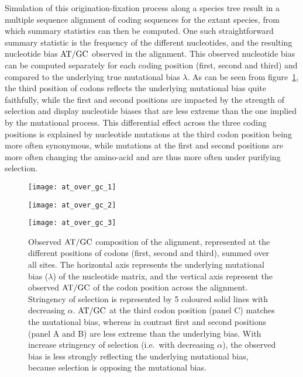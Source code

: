 Simulation of this origination-fixation process along a species tree result in a multiple sequence alignment of coding sequences for the extant species, from which summary statistics can then be computed.
One such straightforward summary statistic is the frequency of the different nucleotides, and the resulting nucleotide bias $\atgc$ observed in the alignment.
This observed nucleotide bias can be computed separately for each coding position (first, second and third) and compared to the underlying true mutational bias $\lambda$.
As can be seen from figure~\ref{fig:mut-bias-AT-GC-obs}, the third position of \glspl{codon} reflects the underlying mutational bias quite faithfully, while the first and second positions are impacted by the strength of selection and display nucleotide biases that are less extreme than the one implied by the mutational process.
This differential effect across the three coding positions is explained by nucleotide mutations at the third \gls{codon} position being more often \gls{synonymous}, while mutations at the first and second positions are more often changing the amino-acid and are thus more often under purifying selection.

\begin{figure}[h]
    \centering
    \begin{minipage}{0.32\linewidth}
        \texttt{[image: at\_over\_gc\_1]}
    \end{minipage}
    \hfill
    \begin{minipage}{0.32\linewidth}
        \texttt{[image: at\_over\_gc\_2]}
    \end{minipage}
    \hfill
    \begin{minipage}{0.32\linewidth}
        \texttt{[image: at\_over\_gc\_3]}
    \end{minipage}
    \hfill
    \caption[$\atgc$ composition of the alignment]{
    Observed $\atgc$ composition of the alignment, represented at the different positions of \glspl{codon} (first, second and third), summed over all sites.
    The horizontal axis represents the underlying mutational bias ($\lambda$) of the nucleotide matrix, and the vertical axis represent the observed $\atgc$ of the \gls{codon} position across the alignment.
    Stringency of selection is represented by 5 coloured solid lines with decreasing $\alpha$.
    $\atgc$ at the third \gls{codon} position (panel C) matches the mutational bias, whereas in contrast first and second positions (panel A and B) are less extreme than the underlying bias.
    With increase stringency of selection (i.e.~with decreasing $\alpha$), the observed bias is less strongly reflecting the underlying mutational bias, because selection is opposing the mutational bias.}
    \label{fig:mut-bias-AT-GC-obs}
\end{figure}

